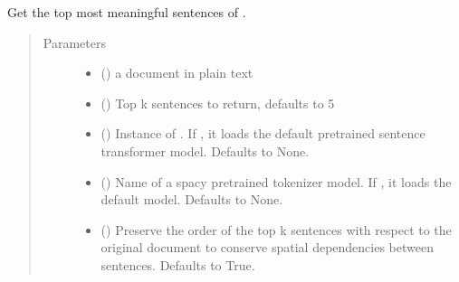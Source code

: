 \documentclass[letterpaper,10pt,english]{sphinxmanual}
\begin{document}
\begin{fulllineitems}
\label{\detokenize{code:code_utils.utils.get_top_k_sentences}}
Get the top  most meaningful sentences of .
\begin{quote}\begin{description}
\item[{Parameters}] \leavevmode\begin{itemize}
\item {} 
 () \textendash{} a document in plain text

\item {} 
 (\sphinxstyleliteralemphasis{\sphinxupquote{, }}) \textendash{} Top k sentences to return, defaults to 5

\item {} 
 (\sphinxstyleliteralemphasis{\sphinxupquote{, }}) \textendash{} Instance of . If , it loads the 
default pretrained sentence transformer model. Defaults to None.

\item {} 
 (\sphinxstyleliteralemphasis{\sphinxupquote{, }}) \textendash{} Name of a spacy pretrained tokenizer model. If , it
loads the default model. Defaults to None.

\item {} 
 (\sphinxstyleliteralemphasis{\sphinxupquote{, }}) \textendash{} Preserve the order of the top k sentences with respect
to the original document to conserve spatial dependencies between sentences.
Defaults to True.


\end{itemize}
\end{description}
\end{quote}
\end{fulllineitems}
\end{document}
